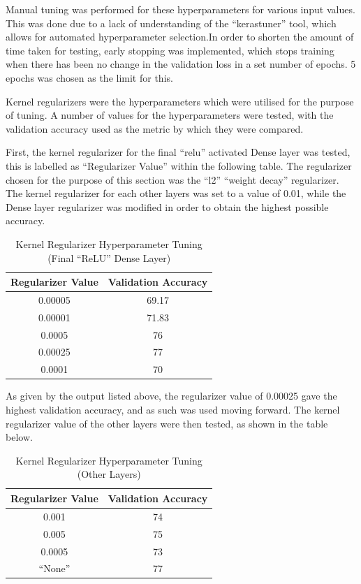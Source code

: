 Manual tuning was performed for these hyperparameters for various input values.
This was done due to a lack of understanding of the ``kerastuner'' tool, which
allows for automated hyperparameter selection.In order to shorten the amount of
time taken for testing, early stopping was implemented, which stops training
when there has been no change in the validation loss in a set number of epochs.
5 epochs was chosen as the limit for this.

Kernel regularizers were the hyperparameters which were utilised for the purpose
of tuning. A number of values for the hyperparameters were tested, with the
validation accuracy used as the metric by which they were compared.

First, the kernel regularizer for the final ``relu'' activated Dense layer was
tested, this is labelled as ``Regularizer Value'' within the following table.
The regularizer chosen for the purpose of this section was the ``l2'' ``weight
decay'' regularizer.
The kernel regularizer for each other layers was set to a value of 0.01,
while the Dense layer regularizer was modified in order to obtain the highest
possible accuracy.

\begin{table}[H]
	\centering
	\caption{Kernel Regularizer Hyperparameter Tuning (Final ``ReLU'' Dense
	Layer)}
	\label{tab:krhyp}
	\begin{tabular}{|c|c|}
	\hline
	Regularizer Value & Validation Accuracy \\
	\hline
	0.00005 & 69.17 \\
	0.00001 & 71.83 \\
	0.0005  & 76 \\
	0.00025 & 77 \\
	0.0001  & 70 \\
	\hline
	\end{tabular}
\end{table}

As given by the output listed above, the regularizer value of 0.00025 gave the
highest validation accuracy, and as such was used moving forward. The kernel
regularizer value of the other layers were then tested, as shown in the table
below.

\begin{table}[H]
	\centering
	\caption{Kernel Regularizer Hyperparameter Tuning (Other Layers)}
	\label{tab:krhypo}
	\begin{tabular}{|c|c|}
	\hline
	Regularizer Value & Validation Accuracy \\
	\hline
	0.001 & 74 \\
	0.005 & 75 \\
	0.0005 & 73 \\
	``None'' & 77 \\
	\hline
	\end{tabular}
\end{table}

